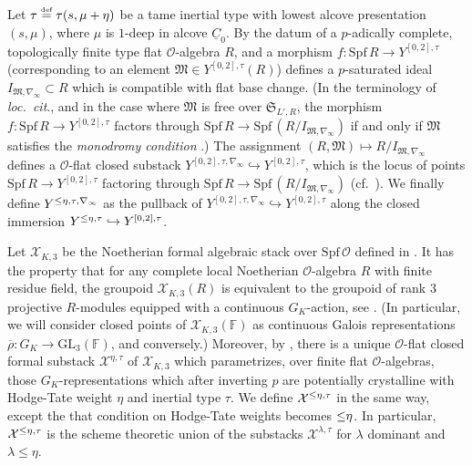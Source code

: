 \documentclass[oneside,a4paper,english, 11pt]{amsart}
\theoremstyle{plain}
\theoremstyle{plain}
\theoremstyle{plain}
\theoremstyle{plain}
\theoremstyle{plain}
\theoremstyle{plain}
\theoremstyle{definition}
\theoremstyle{definition}
\theoremstyle{definition}
\theoremstyle{remark}
\numberwithin{equation}{section}
\newcommand{\F}{\mathbb{F}}
\newcommand{\fM}{\mathfrak{M}}
\newcommand{\fS}{\mathfrak{S}}
\newcommand{\cO}{\mathcal{O}}
\newcommand{\cX}{\mathcal{X}}
\newcommand{\GL}{\mathrm{GL}}
\newcommand{\un}[1]{\underline{#1}}
\newcommand{\rhobar}{\overline{\rho}}
\newcommand{\Spf}{\mathrm{Spf}}
\newcommand{\defeq}{\stackrel{\textrm{\tiny{def}}}{=}}
\DeclareMathOperator{\leqeta}{\text{$\setlength{\thickmuskip}{0mu}\leq\eta$}}
\newcommand{\ra}{\rightarrow}
\newcommand{\into}{\hookrightarrow}
\begin{document}
Let $\tau\defeq \tau(s,\mu+\eta)$ be a tame inertial type with lowest alcove presentation $(s, \mu)$, where $\mu$ is $1$-deep in alcove $\un{C}_0$.
By \cite[Proposition 7.1.6]{MLM} the datum of a $p$-adically complete, topologically finite type flat $\cO$-algebra $R$, and a morphism $f:\Spf\, R \to Y^{[0,2],\tau}$ (corresponding to an element $\fM\in Y^{[0,2],\tau}(R)$) defines a $p$-saturated ideal $I_{\fM,\nabla_{\infty}}\subset R$ which is compatible with flat base change. 
(In the terminology of \emph{loc.~cit}., and in the case where $\fM$ is free over $\fS_{L',R}$, the morphism $f:\Spf\, R \to Y^{[0,2],\tau}$ factors through $\Spf\, R\ra \Spf\, (R/I_{\fM,\nabla_{\infty}})$ if and only if $\fM$ satisfies the \emph{monodromy condition} \cite[Definition 7.1.2]{MLM}.)
The assignment $(R,\fM)\mapsto R/I_{\fM,\nabla_\infty}$ defines a $\cO$-flat closed substack $Y^{[0,2],\tau,\nabla_\infty}\into Y^{[0,2],\tau}$, which is the locus of points $\Spf\, R \to Y^{[0,2],\tau}$ factoring through $\Spf\, R\ra \Spf\, (R/I_{\fM,\nabla_{\infty}})$ (cf.~\cite[\S 7.2]{MLM}).
We finally define $Y^{\leqeta,\tau,\nabla_\infty}$ as the pullback of $Y^{[0,2],\tau,\nabla_\infty}\into Y^{[0,2],\tau}$ along the closed immersion $Y^{\leqeta,\tau}\into Y^{[0,2],\tau}$.

\vspace{3mm}

Let $\cX_{K,3}$ be the Noetherian formal algebraic stack over $\Spf\,\cO$ defined in \cite[Definition 3.2.1]{EGstack}.
It has the property that for any complete local Noetherian $\cO$-algebra $R$ with finite residue field, the groupoid $\cX_{K,3}(R)$ is equivalent to the groupoid of rank $3$ projective $R$-modules equipped with a continuous $G_K$-action, see \cite[\S 3.6.1]{EGstack}.
(In particular, we will consider closed points of $\cX_{K,3}(\F)$ as continuous Galois representations $\rhobar:G_K\rightarrow \GL_3(\F)$, and conversely.)
Moreover, by \cite[Theorem 4.8.12]{EGstack}, there is a unique $\cO$-flat closed formal substack $\cX^{\eta,\tau}$ of $\cX_{K,3}$ which parametrizes, over finite flat $\cO$-algebras, those $G_K$-representations which after inverting $p$ are 
%
potentially crystalline with Hodge-Tate weight $\eta$ and inertial type $\tau$. We define $\cX^{\leqeta,\tau}$ in the same way, except the that condition on Hodge-Tate weights becomes $\leqeta$. In particular, $\cX^{\leqeta,\tau}$ is the scheme theoretic union of the substacks $\cX^{\lambda,\tau}$ for $\lambda$ dominant and $\lambda\leq \eta$.
\end{document}
